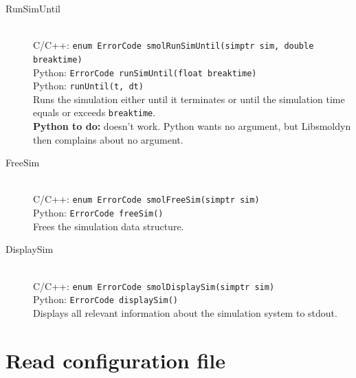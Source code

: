 \documentclass {scrbook}
\newcommand {\ttt} {\texttt}
\begin{document}
\begin{description}
\item[RunSimUntil]
\hfill \\
C/C++: \ttt{enum ErrorCode smolRunSimUntil(simptr sim, double breaktime)}\\
Python: \ttt{ErrorCode runSimUntil(float breaktime)}\\
Python: \ttt{runUntil(t, dt)}\\
Runs the simulation either until it terminates or until the simulation time equals or exceeds \ttt{breaktime}.\\
\textbf{Python to do:} doesn't work. Python wants no argument, but Libsmoldyn then complains about no argument.

\item[FreeSim]
\hfill \\
C/C++: \ttt{enum ErrorCode smolFreeSim(simptr sim)}\\
Python: \ttt{ErrorCode freeSim()}\\
Frees the simulation data structure.

\item[DisplaySim]
\hfill \\
C/C++: \ttt{enum ErrorCode smolDisplaySim(simptr sim)}\\
Python: \ttt{ErrorCode displaySim()}\\
Displays all relevant information about the simulation system to stdout.

\end{description}

\section{Read configuration file}
\end{document}
